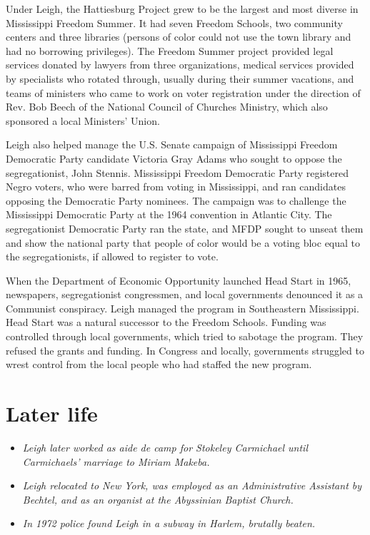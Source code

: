 Under Leigh, the Hattiesburg Project grew to be the largest and most
diverse in Mississippi Freedom Summer. It had seven Freedom Schools, two
community centers and three libraries (persons of color could not use
the town library and had no borrowing privileges). The Freedom Summer
project provided legal services donated by lawyers from three
organizations, medical services provided by specialists who rotated
through, usually during their summer vacations, and teams of ministers
who came to work on voter registration under the direction of Rev. Bob
Beech of the National Council of Churches Ministry, which also sponsored
a local Ministers' Union.

Leigh also helped manage the U.S. Senate campaign of Mississippi Freedom
Democratic Party candidate Victoria Gray Adams who sought to oppose the
segregationist, John Stennis. Mississippi Freedom Democratic Party
registered Negro voters, who were barred from voting in Mississippi, and
ran candidates opposing the Democratic Party nominees. The campaign was
to challenge the Mississippi Democratic Party at the 1964 convention in
Atlantic City. The segregationist Democratic Party ran the state, and
MFDP sought to unseat them and show the national party that people of
color would be a voting bloc equal to the segregationists, if allowed to
register to vote.

When the Department of Economic Opportunity launched Head Start in 1965,
newspapers, segregationist congressmen, and local governments denounced
it as a Communist conspiracy. Leigh managed the program in Southeastern
Mississippi. Head Start was a natural successor to the Freedom Schools.
Funding was controlled through local governments, which tried to
sabotage the program. They refused the grants and funding. In Congress
and locally, governments struggled to wrest control from the local
people who had staffed the new program.

\section{Later life}\label{later-life}

\begin{itemize}
\item
  \emph{Leigh later worked as aide de camp for Stokeley Carmichael until
  Carmichaels' marriage to Miriam Makeba.}
\item
  \emph{Leigh relocated to New York, was employed as an Administrative
  Assistant by Bechtel, and as an organist at the Abyssinian Baptist
  Church.}
\item
  \emph{In 1972 police found Leigh in a subway in Harlem, brutally
  beaten.}
\end{itemize}

